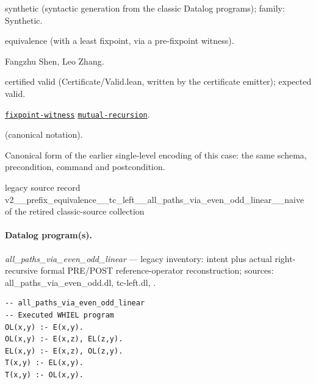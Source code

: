 \documentclass[10pt]{article}
\begin{document}
\begin{description}[leftmargin=2.6cm,style=nextline,itemsep=1pt]

\item[Category] synthetic (syntactic generation from the classic Datalog programs); family: Synthetic.

\item[Kind] equivalence (with a least fixpoint, via a pre-fixpoint witness).

\item[Contributors] Fangzhu Shen, Leo Zhang.

\item[Status] certified valid (Certificate/Valid.lean, written by the certificate emitter); expected valid.

\item[Tags] \hyperref[tag:fixpoint-witness]{\texttt{fixpoint-witness}} \hyperref[tag:mutual-recursion]{\texttt{mutual-recursion}}.

\item[Input]  (canonical notation).

\item[Summary] Canonical form of the earlier single-level encoding of this case: the same schema, precondition, command and postcondition.

\item[Sources] {\raggedright legacy source record v2\_\_prefix\_equivalence\_\_tc\_left\_\_all\_paths\_via\_even\_odd\_linear\_\_naive of the retired classic-source collection\par}

\end{description}

\paragraph{Datalog program(s).}

{\raggedright\textit{all\_paths\_via\_even\_odd\_linear} --- legacy inventory:  intent plus actual right-recursive formal PRE/POST reference-operator reconstruction; sources: all\_paths\_via\_even\_odd.dl, tc-left.dl, .\par}

\begin{Verbatim}[fontsize=\scriptsize,breaklines=true,breakanywhere=true,frame=single,framesep=1.5mm]
-- all_paths_via_even_odd_linear
-- Executed WHIEL program
OL(x,y) :- E(x,y).
OL(x,y) :- E(x,z), EL(z,y).
EL(x,y) :- E(x,z), OL(z,y).
T(x,y) :- EL(x,y).
T(x,y) :- OL(x,y).
\end{Verbatim}
\end{document}
